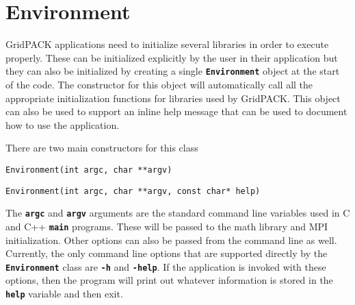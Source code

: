 \section{Environment}\label{environment}

GridPACK applications need to initialize several libraries in order to execute
properly. These can be initialized explicitly by the user in their
application but they can also be initialized by creating a single
\texttt{\textbf{Environment}} object at the start of the code. The constructor
for this object will automatically call all the appropriate initialization
functions for libraries used by GridPACK. This object can also be used to
support an inline help message that can be used to document how to use the
application.

There are two main constructors for this class

{
\color{red}
\begin{Verbatim}[fontseries=b]
Environment(int argc, char **argv)
\end{Verbatim}
}

{
\color{red}
\begin{Verbatim}[fontseries=b]
Environment(int argc, char **argv, const char* help)
\end{Verbatim}
}

The \texttt{\textbf{argc}} and \texttt{\textbf{argv}} arguments are the standard
command line variables used in C and C++ \texttt{\textbf{main}} programs. These
will be passed to the math library and MPI initialization. Other options can also be
passed from the command line as well. Currently, the only command line
options that are supported directly by the \texttt{\textbf{Environment}} class
are \texttt{\textbf{-h}} and \texttt{\textbf{-help}}. If the application is invoked
with these options, then the program will print out whatever information is stored
in the \texttt{\textbf{help}} variable and then exit.
